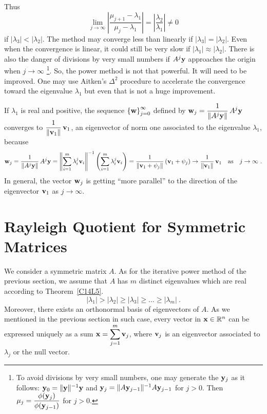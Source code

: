 Thus
\[
\lim_{j\rightarrow \infty}
\left| \frac{\mu_{j+1}-\lambda_1}{\mu_j-\lambda_1} \right|
= \left| \frac{\lambda_2}{\lambda_1} \right| \neq 0
\]
if $|\lambda_3| < |\lambda_2|$.  The method
may converge less than linearly if $|\lambda_3| = |\lambda_2|$.
Even when the convergence is linear, it could still be very slow if
$|\lambda_1| \approx |\lambda_2|$.  There is also the danger of
divisions by very small numbers if $A^j\mathbf{y}$ approaches the origin when
$j \to \infty$ \footnote{To avoid divisions by very small numbers, one
may generate the $\mathbf{y}_j$ as it follows:
$\mathbf{y}_0 = \|\mathbf{y}\|^{-1}\mathbf{y}$ and
$\mathbf{y}_j = \| A\mathbf{y}_{j-1}\|^{-1} A\mathbf{y}_{j-1}$ for $j> 0$.
Then $\displaystyle \mu_j = \frac{\phi(\mathbf{y}_j)}{\phi(\mathbf{y}_{j-1})}$
for $j>0$.}.
So, the power method is not that powerful.  It will need to be
improved.  One may use Aitken's $\Delta^2$ procedure to accelerate the
convergence toward the eigenvalue $\lambda_1$ but even that is not a
huge improvement.

If $\lambda_1$ is real and positive, the sequence
$\displaystyle \left\{\mathbf{w}\right\}_{j=0}^\infty$ defined by
$\displaystyle \mathbf{w}_j = \frac{1}{\|A^j\mathbf{y}\|}\,A^j\mathbf{y}$ converges
to $\displaystyle \frac{1}{\|\mathbf{v}_1\|}\, \mathbf{v}_1$, an
eigenvector of norm one associated to the eigenvalue $\lambda_1$,
because
\[
\mathbf{w}_j = \frac{1}{\|A^j\mathbf{y}\|}\, A^j\mathbf{y}
= \displaystyle \left\| \sum_{i=1}^m \lambda_i^j \mathbf{v}_i\right\|^{-1}
\left( \sum_{i=1}^m \lambda_i^j \mathbf{v}_i \right)
= \frac{1}{\displaystyle \left\| \mathbf{v}_1 + \psi_j \right\|}
\left( \mathbf{v}_1 + \psi_j \right)
\to \frac{1}{\displaystyle \| \mathbf{v}_1 \|} \, \mathbf{v}_1
\quad \text{as} \quad  j \to \infty \ .
\]
In general, the vector $\mathbf{w}_j$ is getting ``more parallel'' to
the direction of the eigenvector $\mathbf{v}_1$ as $j \to \infty$.

\section{Rayleigh Quotient for Symmetric Matrices}

We consider a \nn symmetric matrix $A$.  As for the iterative power method
of the previous section, we assume that $A$ has $m$ distinct
eigenvalues which are real according to Theorem~\ref{C14L5}.
\[
|\lambda_1| > |\lambda_2| \geq |\lambda_3| \geq \ldots \geq |\lambda_m| \ .
\]
Moreover, there exists an orthonormal basis of eigenvectors of $A$.
As we mentioned in the previous section in such case, 
every vector in $\mathbf{x} \in \mathbb{R}^n$ can be expressed uniquely as a
sum $\displaystyle \mathbf{x} = \sum_{j=1}^m \mathbf{v}_j$, where
$\mathbf{v}_j$ is an eigenvector associated to $\lambda_j$ or the null
vector.

